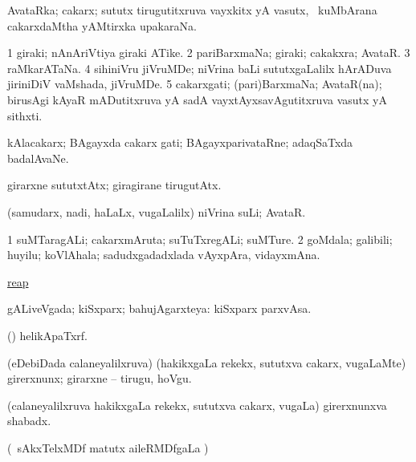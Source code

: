 \bentry
{} 
\gl{\nA}
\expl{}
\bmng
AvataRka; cakarx; sututx tirugutitxruva vayxkitx yA vasutx, \kanmu\ kuMbArana cakarxdaMtha yAMtirxka upakaraNa. 
\emng
\eentry

\bentry
{} 
\gl{\nA}
\expl{}
\bmng
\bnum
\num{1} giraki; nAnAriVtiya giraki ATike. 
\num{2} pariBarxmaNa; giraki; cakakxra; AvataR. 
\num{3} raMkarATaNa. 
\num{4} sihiniVru jiVruMDe; niVrina baLi sututxgaLalilx hArADuva jiriniDiV vaMshada, jiVruMDe. 
\num{5} cakarxgati; (pari)BarxmaNa; AvataR(na); birusAgi kAyaR mADutitxruva yA sadA vayxtAyxsavAgutitxruva vasutx yA sithxti. 
\enum
\emng

\noindent
\gl{\pagu}
\expl{}
\bmng
{} kAlacakarx; BAgayxda cakarx gati; BAgayxparivataRne; adaqSaTxda badalAvaNe. 
\emng
\eentry

\bentry
{} 
\gl{\kirxvi}
\expl{}
\bmng
girarxne sututxtAtx; giragirane tirugutAtx. 
\emng
\eentry

\bentry
{} 
\gl{\nA}
\expl{}
\bmng
(samudarx, nadi, haLaLx, \mo vugaLalilx) niVrina suLi; AvataR. 
\emng
\eentry

\bentry
{} 
\gl{\nA}
\expl{}
\bmng
\bnum
\num{1} suMTaragALi; cakarxmAruta; suTuTxregALi; suMTure. 
\num{2} goMdala; galibili; huyilu; koVlAhala; sadudxgadadxlada vAyxpAra, vidayxmAna. 
\enum
\emng

\noindent
\gl{\pagu}
\expl{}
\bmng
{} \hyperref{kandict_r.pdf}{R}{reap pagu1}{reap}  
\emng
\eentry

\bentry
{}
\gl{\gu}
\expl{}
\bmng
gALiveVgada; kiSxparx; bahujAgarxteya:  kiSxparx parxvAsa. 
\emng
\eentry

\bentry
{} 
\gl{\nA}
\expl{}
\bmng
(\AmA) helikApaTxrf. 
\emng
\eentry

\bentry
{} 
\gl{\akirx}
\bmng
(eDebiDada calaneyalilxruva) (hakikxgaLa rekekx, sututxva cakarx, \mo vugaLaMte) girerxnunx; girarxne -- tirugu, hoVgu. 
\emng
\eentry

\bentry
{} 
\pron{}
\gl{\nA}
\expl{}
\bmng
(calaneyalilxruva hakikxgaLa rekekx, sututxva cakarx, \mo vugaLa) girerxnunxva shabadx. 
\emng
\eentry

\bentry
{} 
\gl{\kirx}
\expl{}
\bmng
(\kanmu\ sAkxTelxMDf matutx aileRMDfgaLa \pArxM) 
\emng

